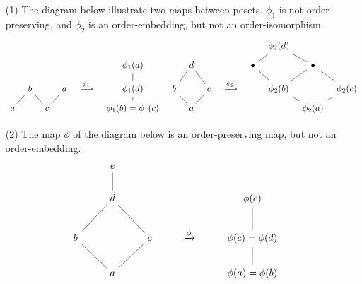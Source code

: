 \begin{example}\label{example_1.15}
  \begin{enumerate}
    \item[(1)] The diagram below illustrate two maps between posets.
      $\phi_1$ is not order-preserving, and $\phi_2$ is an
      order-embedding, but not an order-isomorphism.
      \[\begin{tikzcd}[sep = tiny]
        &&&&&&&&&&& {\phi_2(d)} \\
        &&&&& {\phi_1(a)} && d &&& \bullet && \bullet \\
        & b && d & {\xrightarrow{\phi_1}} & {\phi_1(d)} & b && c & {\xrightarrow{\phi_2}} && {\phi_2(b)} && {\phi_2(c)} \\
        a && c &&& {\phi_1(b)=\phi_1(c)} && a &&&&& {\phi_2(a)}
        \arrow[no head, from=2-11, to=1-12]
        \arrow[no head, from=2-13, to=1-12]
        \arrow[no head, from=3-2, to=4-3]
        \arrow[no head, from=3-6, to=2-6]
        \arrow[no head, from=3-7, to=2-8]
        \arrow[no head, from=3-9, to=2-8]
        \arrow[no head, from=3-12, to=2-11]
        \arrow[no head, from=3-12, to=2-13]
        \arrow[no head, from=3-14, to=2-13]
        \arrow[no head, from=4-1, to=3-2]
        \arrow[no head, from=4-3, to=3-4]
        \arrow[no head, from=4-6, to=3-6]
        \arrow[no head, from=4-8, to=3-7]
        \arrow[no head, from=4-8, to=3-9]
        \arrow[no head, from=4-13, to=3-12]
        \arrow[no head, from=4-13, to=3-14]
      \end{tikzcd}\]

    \item[(2)] The map $\phi$ of the diagram below is an
      order-preserving map, but not an order-embedding.
      \[\begin{tikzcd}
        & e \\
        & d &&& {\phi(e)} \\
        b && c & {\xrightarrow{\phi}} & {\phi(c)=\phi(d)} \\
        & a &&& {\phi(a)=\phi(b)}
        \arrow[no head, from=2-2, to=1-2]
        \arrow[no head, from=3-1, to=2-2]
        \arrow[no head, from=3-3, to=2-2]
        \arrow[no head, from=3-5, to=2-5]
        \arrow[no head, from=4-2, to=3-1]
        \arrow[no head, from=4-2, to=3-3]
        \arrow[no head, from=4-5, to=3-5]
      \end{tikzcd}\]
  \end{enumerate}
\end{example}

